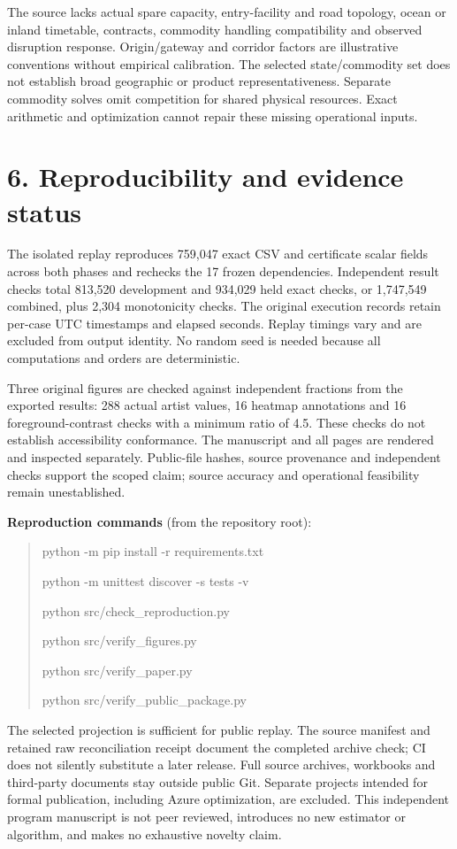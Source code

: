 \documentclass[11pt]{article}
\begin{document}
The source lacks actual spare capacity, entry-facility and road topology, ocean or inland timetable, contracts, commodity handling compatibility and observed disruption response. Origin/gateway and corridor factors are illustrative conventions without empirical calibration. The selected state/commodity set does not establish broad geographic or product representativeness. Separate commodity solves omit competition for shared physical resources. Exact arithmetic and optimization cannot repair these missing operational inputs.

\newpage
\section*{6. Reproducibility and evidence status}
The isolated replay reproduces 759,047 exact CSV and certificate scalar fields across both phases and rechecks the 17 frozen dependencies. Independent result checks total 813,520 development and 934,029 held exact checks, or 1,747,549 combined, plus 2,304 monotonicity checks. The original execution records retain per-case UTC timestamps and elapsed seconds. Replay timings vary and are excluded from output identity. No random seed is needed because all computations and orders are deterministic.

Three original figures are checked against independent fractions from the exported results: 288 actual artist values, 16 heatmap annotations and 16 foreground-contrast checks with a minimum ratio of 4.5. These checks do not establish accessibility conformance. The manuscript and all pages are rendered and inspected separately. Public-file hashes, source provenance and independent checks support the scoped claim; source accuracy and operational feasibility remain unestablished.

\textbf{Reproduction commands} (from the repository root):
\begin{quote}\small\ttfamily
python -m pip install -r requirements.txt\par
python -m unittest discover -s tests -v\par
python src/check\_reproduction.py\par
python src/verify\_figures.py\par
python src/verify\_paper.py\par
python src/verify\_public\_package.py
\end{quote}
The selected projection is sufficient for public replay. The source manifest and retained raw reconciliation receipt document the completed archive check; CI does not silently substitute a later release. Full source archives, workbooks and third-party documents stay outside public Git. Separate projects intended for formal publication, including Azure optimization, are excluded. This independent program manuscript is not peer reviewed, introduces no new estimator or algorithm, and makes no exhaustive novelty claim.
\end{document}
